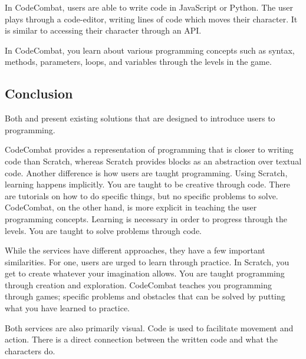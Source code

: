 In CodeCombat, users are able to write code in JavaScript or Python\cite{CodeCombatCodingGames}. The user plays through a code-editor, writing lines of code which moves their character. It is similar to accessing their character through an API.

In CodeCombat, you learn about various programming concepts such as syntax, methods, parameters, loops, and variables through the levels in the game\cite{CodeCombatCodingGames}.

\subsection{Conclusion}
Both  and  present existing solutions that are designed to introduce users to programming.

CodeCombat provides a representation of programming that is closer to writing code than Scratch, whereas Scratch provides blocks as an abstraction over textual code.
Another difference is how users are taught programming.
Using Scratch, learning happens implicitly.
You are taught to be creative through code. There are tutorials on how to do specific things, but no specific problems to solve.
CodeCombat, on the other hand, is more explicit in teaching the user programming concepts.
Learning is necessary in order to progress through the levels. You are taught to solve problems through code.

While the services have different approaches, they have a few important similarities.
For one, users are urged to learn through practice.
In Scratch, you get to create whatever your imagination allows. You are taught programming through creation and exploration.
CodeCombat teaches you programming through games; specific problems and obstacles that can be solved by putting what you have learned to practice.

Both services are also primarily visual.
Code is used to facilitate movement and action.
There is a direct connection between the written code and what the characters do.